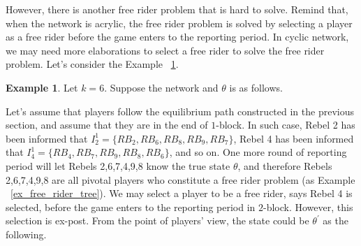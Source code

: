 \documentclass[12pt,letter]{article}
\theoremstyle{definition}
\newtheorem{example}{Example}[section]
\theoremstyle{remark}
\theoremstyle{claim}
\begin{document}
However, there is another free rider problem that is hard to solve. Remind that, when the network is acrylic, the free rider problem is solved by selecting a player as a free rider before the game enters to the reporting period. In cyclic network, we may need more elaborations to select a free rider to solve the free rider problem. Let's consider the Example ~\ref{ex_free_rider_cycle}.
\begin{example}\label{ex_free_rider_cycle}
Let $k=6$. Suppose the network and $\theta$ is as follows. 

\begin{center}
\end{center}

Let's assume that players follow the equilibrium path constructed in the previous section, and assume that they are in the end of $1$-block. In such case, Rebel 2 has been informed that $I^1_2=\{RB_2,RB_6,RB_8,RB_9,RB_7\}$, Rebel 4 has been informed that $I^1_4=\{RB_4,RB_7,RB_9,RB_8,RB_6\}$, and so on. One more round of reporting period will let Rebels 2,6,7,4,9,8 know the true state $\theta$, and therefore Rebels 2,6,7,4,9,8 are all pivotal players who constitute a free rider problem (as Example ~\ref{ex_free_rider_tree}). We may select a player to be a free rider, says Rebel 4 is selected, before the game enters to the reporting period in $2$-block. However, this selection is ex-post. From the point of players' view, the state could be $\theta^{'}$ as the following.

\begin{center}
\end{center}
\end{example}
\end{document}
